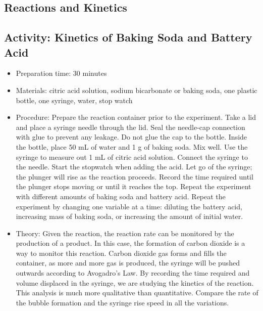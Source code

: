 \begin{itemize}
{\begin{itemize}
\begin{itemize}
{\section{Reactions and Kinetics}

\subsection{Activity: Kinetics of Baking Soda and Battery Acid}
\begin{itemize}
\item{Preparation time: 30 minutes}
\item{Materials: citric acid solution, sodium bicarbonate or baking soda, one plastic bottle, one syringe, water, stop watch}
\item{Procedure: Prepare the reaction container prior to the experiment. Take a lid and place a syringe needle through the lid. Seal the needle-cap connection with glue to prevent any leakage. Do not glue the cap to the bottle. Inside the bottle, place 50 mL of water and 1 g of baking soda. Mix well. Use the syringe to measure out 1 mL of citric acid solution. Connect the syringe to the needle. Start the stopwatch when adding the acid. Let go of the syringe; the plunger will rise as the reaction proceeds. Record the time required until the plunger stops moving or until it reaches the top. Repeat the experiment with different amounts of baking soda and battery acid. Repeat the experiment by changing one variable at a time: diluting the battery acid, increasing mass of baking soda, or increasing the amount of initial water. }
\item{Theory: Given the reaction, the reaction rate can be monitored by the production of a product. In this case, the formation of carbon dioxide is a way to monitor this reaction. Carbon dioxide gas forms and fills the container, as more and more gas is produced, the syringe will be pushed outwards according to Avogadro’s Law. By recording the time required and volume displaced in the syringe, we are studying the kinetics of the reaction. This analysis is much more qualitative than quantitative. Compare the rate of the bubble formation and the syringe rise speed in all the variations. }
\end{itemize}

}
\end{itemize}
\end{itemize}}
\end{itemize}
